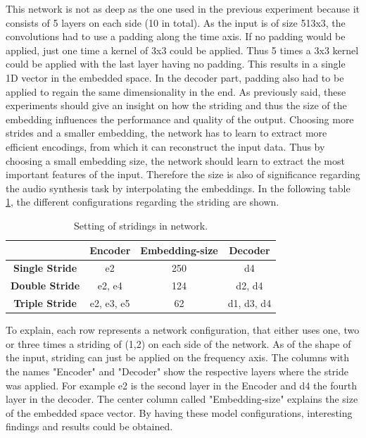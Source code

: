 This network is not as deep as the one used in the previous experiment because it consists of 5 layers on each side (10 in total). As the input is of size 513x3, the convolutions had to use a padding along the time axis. If no padding would be applied, just one time a kernel of 3x3 could be applied. Thus 5 times a 3x3 kernel could be applied with the last layer having no padding. This results in a single 1D vector in the embedded space. In the decoder part, padding also had to be applied to regain the same dimensionality in the end. As previously said, these experiments should give an insight on how the striding and thus the size of the embedding influences the performance and quality of the output. Choosing more strides and a smaller embedding, the network has to learn to extract more efficient encodings, from which it can reconstruct the input data. Thus by choosing a small embedding size, the network should learn to extract the most important features of the input. Therefore the size is also of significance regarding the audio synthesis task by interpolating the embeddings. In the following table \ref{tab:exp_2D_strides}, the different configurations regarding the striding are shown. 


\begin{table}[htb!]
    \centering
    \begin{tabular}{|c|c|c|c|}
        \hline
         &\textbf{Encoder}&\textbf{Embedding-size}&\textbf{Decoder} \\
         \hline
        \textbf{Single Stride} & e2 & 250 & d4 \\
        \hline
        \textbf{Double Stride} & e2, e4 & 124 & d2, d4 \\
        \hline
        \textbf{Triple Stride} & e2, e3, e5 & 62 & d1, d3, d4 \\
        \hline
    \end{tabular}
    \caption{Setting of stridings in network.}
    \label{tab:exp_2D_strides}
\end{table}

To explain, each row represents a network configuration, that either uses one, two or three times a striding of (1,2) on each side of the network. As of the shape of the input, striding can just be applied on the frequency axis. The columns with the names "Encoder" and "Decoder" show the respective layers where the stride was applied. For example e2 is the second layer in the Encoder and d4 the fourth layer in the decoder. The center column called "Embedding-size" explains the size of the embedded space vector. By having these model configurations, interesting findings and results could be obtained. 

